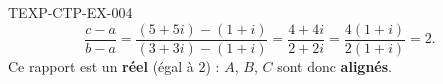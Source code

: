 \begin{corrige}{TEXP-CTP-EX-004}
\[
  \frac{c-a}{b-a} = \frac{(5+5i)-(1+i)}{(3+3i)-(1+i)} = \frac{4+4i}{2+2i} = \frac{4(1+i)}{2(1+i)} = 2.
\]
Ce rapport est un \textbf{réel} (égal à $2$) : $A$, $B$, $C$ sont donc \textbf{alignés}.
\end{corrige}
